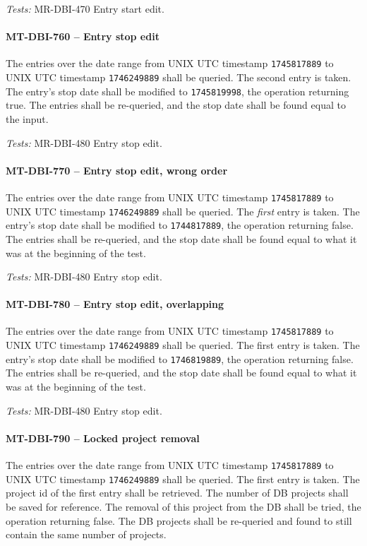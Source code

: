 \textit{Tests: } MR-DBI-470 Entry start edit.

\paragraph{MT-DBI-760 -- Entry stop edit}
The entries over the date range from UNIX UTC timestamp
\lstinline{1745817889} to UNIX UTC timestamp \lstinline{1746249889}
shall be queried. The second entry is taken.
The entry's stop date shall be modified to \lstinline{1745819998},
the operation returning true.
The entries shall be re-queried, and the stop date shall be
found equal to the input.

\textit{Tests: } MR-DBI-480 Entry stop edit.

\paragraph{MT-DBI-770 -- Entry stop edit, wrong order}
The entries over the date range from UNIX UTC timestamp
\lstinline{1745817889} to UNIX UTC timestamp \lstinline{1746249889}
shall be queried. The \emph{first} entry is taken.
The entry's stop date shall be modified to \lstinline{1744817889},
the operation returning false.
The entries shall be re-queried, and the stop date shall be
found equal to what it was at the beginning of the test.

\textit{Tests: } MR-DBI-480 Entry stop edit.

\paragraph{MT-DBI-780 -- Entry stop edit, overlapping}
The entries over the date range from UNIX UTC timestamp
\lstinline{1745817889} to UNIX UTC timestamp \lstinline{1746249889}
shall be queried. The first entry is taken.
The entry's stop date shall be modified to \lstinline{1746819889},
the operation returning false.
The entries shall be re-queried, and the stop date shall be
found equal to what it was at the beginning of the test.

\textit{Tests: } MR-DBI-480 Entry stop edit.

\paragraph{MT-DBI-790 -- Locked project removal}
The entries over the date range from UNIX UTC timestamp
\lstinline{1745817889} to UNIX UTC timestamp \lstinline{1746249889}
shall be queried. The first entry is taken.
The project id of the first entry shall be retrieved.
The number of DB projects shall be saved for reference.
The removal of this project from the DB shall be tried, the operation
returning false. The DB projects shall be re-queried and found to still
contain the same number of projects.

